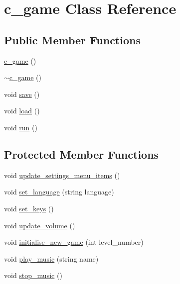 \hypertarget{classc__game}{\section{c\-\_\-game Class Reference}
\label{classc__game}
}
\subsection*{Public Member Functions}
\begin{DoxyCompactItemize}
\item 
\hyperlink{classc__game_a80ba0af58ad4a8b007ef4439a0b50202}{c\-\_\-game} ()
\item 
\hyperlink{classc__game_a43a65b188a13d1a8fcc5f4d9c2a6b4a2}{$\sim$c\-\_\-game} ()
\item 
void \hyperlink{classc__game_ab7af3afd73ab340a3619a889acab04f6}{save} ()
\item 
void \hyperlink{classc__game_ab57f43f89cdbed48784ede8b94d26583}{load} ()
\item 
void \hyperlink{classc__game_a6a385eb93282f5729e49c1c1e4c79741}{run} ()
\end{DoxyCompactItemize}
\subsection*{Protected Member Functions}
\begin{DoxyCompactItemize}
\item 
void \hyperlink{classc__game_a57105293613765eeb0830fe571e4b80e}{update\-\_\-settings\-\_\-menu\-\_\-items} ()
\item 
void \hyperlink{classc__game_ada5dc37b2335e825c6e4a6dc7fb81d98}{set\-\_\-language} (string language)
\item 
void \hyperlink{classc__game_af7b07bd82ee6a33a22043df2edad5c8d}{set\-\_\-keys} ()
\item 
void \hyperlink{classc__game_a2a93ba7b30db3d2f7b67b4bebc4490b3}{update\-\_\-volume} ()
\item 
void \hyperlink{classc__game_a3093e9488bace77055836984efbc68f7}{initialise\-\_\-new\-\_\-game} (int level\-\_\-number)
\item 
void \hyperlink{classc__game_ae09498c8ed7418d8292d539cf847d39f}{play\-\_\-music} (string name)
\item 
void \hyperlink{classc__game_a234499776f426ddd238a374faded61ee}{stop\-\_\-music} ()
\end{DoxyCompactItemize}
